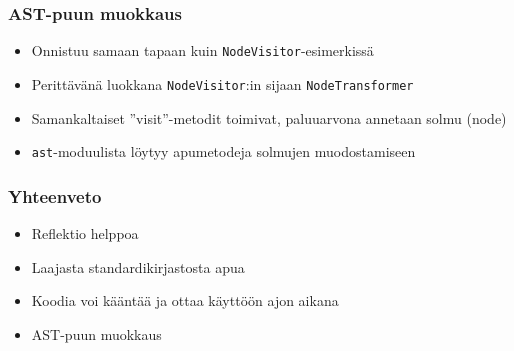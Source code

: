 \documentclass{beamer}
\begin{document}
\begin{frame}[fragile]
\frametitle{AST-puun muokkaus}
\begin{itemize}
\item{Onnistuu samaan tapaan kuin \verb|NodeVisitor|-esimerkissä}
\item{Perittävänä luokkana \verb|NodeVisitor|:in sijaan \verb|NodeTransformer|}
\item{Samankaltaiset ''visit''-metodit toimivat, paluuarvona annetaan solmu (node)}
\item{\verb|ast|-moduulista löytyy apumetodeja solmujen muodostamiseen}
\end{itemize}
\end{frame}


\begin{frame}[fragile]
  \frametitle{Yhteenveto}
\begin{itemize}
\item{Reflektio helppoa}
\item{Laajasta standardikirjastosta apua}
\item{Koodia voi kääntää ja ottaa käyttöön ajon aikana}
\item{AST-puun muokkaus}
\end{itemize}
\end{frame}
\end{document}
